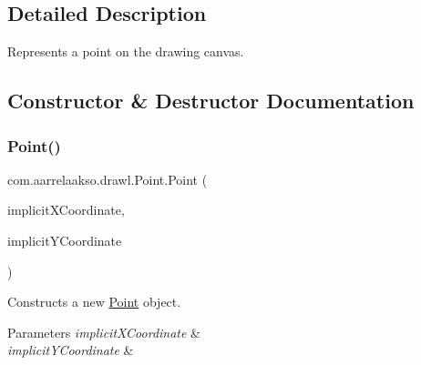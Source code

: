 \subsection{Detailed Description}
Represents a point on the drawing canvas. 

\subsection{Constructor \& Destructor Documentation}
\mbox{\label{classcom_1_1aarrelaakso_1_1drawl_1_1_point_a934b3150ce40f5da49f10ed45a957e32}} 
\subsubsection{\texorpdfstring{Point()}{Point()}\hspace{0.1cm}{\footnotesize\ttfamily [1/2]}}
{\footnotesize\ttfamily com.\+aarrelaakso.\+drawl.\+Point.\+Point (\begin{DoxyParamCaption}\item[{\hyperlink{classcom_1_1aarrelaakso_1_1drawl_1_1_drawl_number}{Drawl\+Number}}]{implicit\+X\+Coordinate,  }\item[{\hyperlink{classcom_1_1aarrelaakso_1_1drawl_1_1_drawl_number}{Drawl\+Number}}]{implicit\+Y\+Coordinate }\end{DoxyParamCaption})\hspace{0.3cm}{\ttfamily [protected]}}



Constructs a new \hyperlink{classcom_1_1aarrelaakso_1_1drawl_1_1_point}{Point} object. 


\begin{DoxyParams}{Parameters}
{\em implicit\+X\+Coordinate} & \\
\hline
{\em implicit\+Y\+Coordinate} & \\
\hline
\end{DoxyParams}
\mbox{\label{classcom_1_1aarrelaakso_1_1drawl_1_1_point_a7dafad597a0de883a2168702294ac42c}} 
